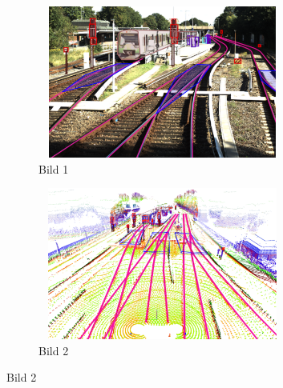 \begin{figure}[H]
    \centering
    \begin{subfigure}{0.45\textwidth}
        \centering
        \includegraphics[width=0.9\textwidth,height=5cm]{PICs/datasets/OSDaR23_dataset/labeled_image.png}
        \caption{Bild 1}
    \end{subfigure}%
    \hspace{0.05\textwidth}
    \begin{subfigure}{0.45\textwidth}
        \centering
        \includegraphics[width=0.9\textwidth,height=5cm]{PICs/datasets/OSDaR23_dataset/labeled_3D.png}
        \caption{Bild 2}
    \end{subfigure}

    \vspace{0.5cm} %


\end{figure}
